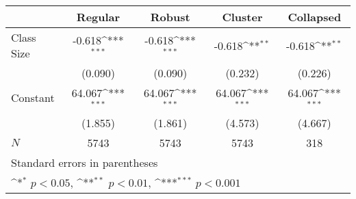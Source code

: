 {
\def\sym#1{\ifmmode^{#1}\else\(^{#1}\)\fi}
\begin{tabular}{l*{4}{c}}
\hline\hline
            &\multicolumn{1}{c}{Regular}&\multicolumn{1}{c}{Robust}&\multicolumn{1}{c}{Cluster}&\multicolumn{1}{c}{Collapsed}\\
\hline
Class Size  &      -0.618\sym{***}&      -0.618\sym{***}&      -0.618\sym{**} &      -0.618\sym{**} \\
            &     (0.090)         &     (0.090)         &     (0.232)         &     (0.226)         \\
[1em]
Constant    &      64.067\sym{***}&      64.067\sym{***}&      64.067\sym{***}&      64.067\sym{***}\\
            &     (1.855)         &     (1.861)         &     (4.573)         &     (4.667)         \\
\hline
\(N\)       &        5743         &        5743         &        5743         &         318         \\
\hline\hline
\multicolumn{5}{l}{\footnotesize Standard errors in parentheses}\\
\multicolumn{5}{l}{\footnotesize \sym{*} \(p<0.05\), \sym{**} \(p<0.01\), \sym{***} \(p<0.001\)}\\
\end{tabular}
}
